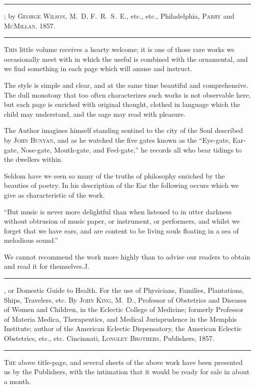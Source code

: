 
\fancybreak{* * *}
\footnotesize
{}; by \textsc{George Wilson}, M.~D, F.~R.~S.~E., etc., etc.,
Philadelphia, \textsc{Parry} and \textsc{McMillan}. 1857.
\plainbreak{1}
\normalsize

\lettrine[lines=1]{}{This} little volume receives a hearty welcome; it is one of those rare
works we occasionally meet with in which the useful is combined
with the ornamental, and we find something in each page which will
amuse and instruct.

The style is simple and clear, and at the same time beautiful and
comprehensive. The dull monotony that too often characterizes such
works is not observable here, but each page is enriched with original
thought, clothed in language which the child may understand, and the
sage may read with pleasure.

The Author imagines himself standing sentinel to the city of the Soul
described by \textsc{John Bunyan}, and as he watched the five gates known
as the ``Eye-gate, Ear-gate, Nose-gate, Mouth-gate, and Feel-gate,'' he
records all who bear tidings to the dwellers within.

Seldom have we seen so many of the truths of philosophy enriched
by the beauties of poetry. In his description of the Ear the following
occurs which we give as characteristic of the work.

``But music is never more delightful than when listened to in utter
darkness without obtrusion of music paper, or instrument, or performers,
and whilst we forget that we have ears, and are content to be living
souls floating in a sea of melodious sound.''

We cannot recommend the work more highly than to advise our readers
to obtain and read it for themselves.\hfill{}J.\quad{}

\fancybreak{* * *}

, or Domestic Guide to Health. For the use of Physicians,
Families, Plantations, Ships, Travelers, etc. By \textsc{John King}, M.~D., Professor of
Obstetrics and Diseases of Women and Children, in the Eclectic College of Medicine;
formerly Professor of Materia Medica, Therapeutics, and Medical Jurisprudence in the
Memphis Institute; author of the American Eclectic Dispensatory, the American
Eclectic Obstetrics, etc., etc. Cincinnati, \textsc{Longley Brothers}, Publishers, 1857.
\plainbreak{1}
\normalsize

\lettrine[lines=1]{}{The} above title-page, and several sheets of the above work have
been presented us by the Publishers, with the intimation that it would
be ready for sale in about a month.

